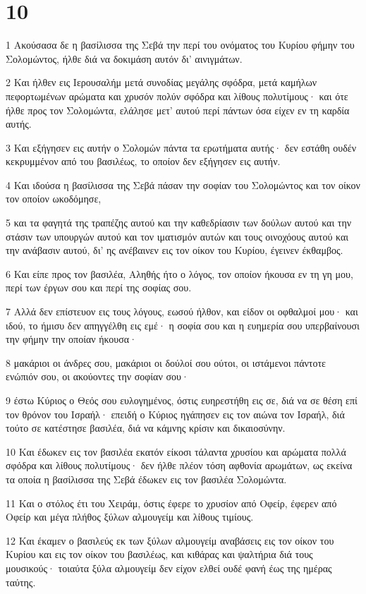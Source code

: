 \chapter{10}

\par 1 Ακούσασα δε η βασίλισσα της Σεβά την περί του ονόματος του Κυρίου φήμην του Σολομώντος, ήλθε διά να δοκιμάση αυτόν δι' αινιγμάτων.
\par 2 Και ήλθεν εις Ιερουσαλήμ μετά συνοδίας μεγάλης σφόδρα, μετά καμήλων πεφορτωμένων αρώματα και χρυσόν πολύν σφόδρα και λίθους πολυτίμους· και ότε ήλθε προς τον Σολομώντα, ελάλησε μετ' αυτού περί πάντων όσα είχεν εν τη καρδία αυτής.
\par 3 Και εξήγησεν εις αυτήν ο Σολομών πάντα τα ερωτήματα αυτής· δεν εστάθη ουδέν κεκρυμμένον από του βασιλέως, το οποίον δεν εξήγησεν εις αυτήν.
\par 4 Και ιδούσα η βασίλισσα της Σεβά πάσαν την σοφίαν του Σολομώντος και τον οίκον τον οποίον ωκοδόμησε,
\par 5 και τα φαγητά της τραπέζης αυτού και την καθεδρίασιν των δούλων αυτού και την στάσιν των υπουργών αυτού και τον ιματισμόν αυτών και τους οινοχόους αυτού και την ανάβασιν αυτού, δι' ης ανέβαινεν εις τον οίκον του Κυρίου, έγεινεν έκθαμβος.
\par 6 Και είπε προς τον βασιλέα, Αληθής ήτο ο λόγος, τον οποίον ήκουσα εν τη γη μου, περί των έργων σου και περί της σοφίας σου.
\par 7 Αλλά δεν επίστευον εις τους λόγους, εωσού ήλθον, και είδον οι οφθαλμοί μου· και ιδού, το ήμισυ δεν απηγγέλθη εις εμέ· η σοφία σου και η ευημερία σου υπερβαίνουσι την φήμην την οποίαν ήκουσα·
\par 8 μακάριοι οι άνδρες σου, μακάριοι οι δούλοί σου ούτοι, οι ιστάμενοι πάντοτε ενώπιόν σου, οι ακούοντες την σοφίαν σου·
\par 9 έστω Κύριος ο Θεός σου ευλογημένος, όστις ευηρεστήθη εις σε, διά να σε θέση επί τον θρόνον του Ισραήλ· επειδή ο Κύριος ηγάπησεν εις τον αιώνα τον Ισραήλ, διά τούτο σε κατέστησε βασιλέα, διά να κάμνης κρίσιν και δικαιοσύνην.
\par 10 Και έδωκεν εις τον βασιλέα εκατόν είκοσι τάλαντα χρυσίου και αρώματα πολλά σφόδρα και λίθους πολυτίμους· δεν ήλθε πλέον τόση αφθονία αρωμάτων, ως εκείνα τα οποία η βασίλισσα της Σεβά έδωκεν εις τον βασιλέα Σολομώντα.
\par 11 Και ο στόλος έτι του Χειράμ, όστις έφερε το χρυσίον από Οφείρ, έφερεν από Οφείρ και μέγα πλήθος ξύλων αλμουγείμ και λίθους τιμίους.
\par 12 Και έκαμεν ο βασιλεύς εκ των ξύλων αλμουγείμ αναβάσεις εις τον οίκον του Κυρίου και εις τον οίκον του βασιλέως, και κιθάρας και ψαλτήρια διά τους μουσικούς· τοιαύτα ξύλα αλμουγείμ δεν είχον ελθεί ουδέ φανή έως της ημέρας ταύτης.
